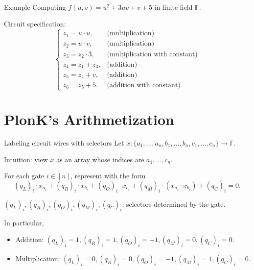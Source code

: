 \documentclass{beamer}
\begin{document}
	\begin{frame}{Example}
		Computing $f(u, v) = u^2 + 3uv + v + 5$ in finite field $\mathbb{F}$. 
		
		 Circuit specification:
		 \begin{equation*}
		 	\begin{cases}
		 		z_1 = u \cdot u,&\text{(multiplication)}\\
		 		z_2 = u \cdot v,&\text{(multiplication)}\\
		 		z_3 = z_2 \cdot 3,&\text{(multiplication with constant)}\\
		 		z_4 = z_1 + z_3,&\text{(addition)}\\
		 		z_5 = z_4 + v,&\text{(addition)}\\
		 		z_6 = z_5 + 5.&\text{(addition with constant)}
		 	\end{cases}
		 \end{equation*}
	\end{frame}

	\section{PlonK's Arithmetization}
	\begin{frame}{Labeling circuit wires with selectors}
		Let $x : \{a_1, \dots, a_n, b_1, \dots, b_n, c_1, \dots, c_n\} \rightarrow \mathbb{F}$.
		
		Intuition: view $x$ as an array whose indices are $a_1, \dots, c_n$.
		
		For each gate $i \in [n]$, represent with the form
		\begin{equation*}
			(q_L)_i \cdot x_{a_i} + (q_R)_i \cdot x_{b_i} + (q_O)_i \cdot x_{c_i} + (q_M)_i \cdot (x_{a_i} \cdot x_{b_i}) + (q_C)_i = 0.
		\end{equation*}
		
		$(q_L)_i, (q_R)_i, (q_O)_i, (q_M)_i, (q_C)_i$: selectors determined by the gate.
		
		In particular,
		\begin{itemize}
			\item Addition: $(q_L)_i = 1, (q_R)_i = 1, (q_O)_i = -1, (q_M)_i = 0, (q_C)_i = 0$.
			\item Multiplication: $(q_L)_i = 0, (q_R)_i = 0, (q_O)_i = -1, (q_M)_i = 1, (q_C)_i = 0$.
		\end{itemize}
	\end{frame}
\end{document}
